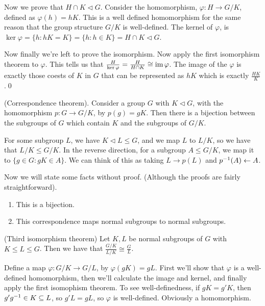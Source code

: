 \documentclass{article}
\newcommand{\nrm}{\triangleleft}
\begin{document}
\par
Now we prove that $ H\cap K\nrm G $. Consider the homomorphism, $ \varphi: H\to G/K $, defined as $ \varphi(h)=hK $. This is a well defined homomorphism for the same reason that the group structure $ G/K $ is well-defined. The kernel of $ \varphi $, is $ \ker \varphi = \{h: hK=K\}=\{h:h\in K\}=H\cap K\nrm G $.

\par
Now finally we're left to prove the isomorphism. Now apply the first isomorphism theorem to $ \varphi $. This tells us that $ \frac H{\ker \varphi}=\frac H {H\cap K}\cong \operatorname{im} \varphi $. The image of the $ \varphi $ is exactly those coests of $ K $ in $ G $ that can be represented as $ hK $ which is exactly $ \frac{HK}K $.\qed
\begin{theorem}
	(Correspondence theorem). Consider a group $ G $ with $ K\nrm G $, with the homomorphism $ p:G\to G/K $, by $ p(g)=gK $. Then there is a bijection between the subgroups of $ G $ which contain $ K $ and the subgroups of $ G/K $.
\end{theorem}
\pf For some subgroup $ L $, we have $ K\nrm L \le G $, and we map $ L $ to $ L/K $, so we have that $ L/K\le G/K $. In the reverse direction, for a subgroup $ A\le G/K $, we map it to $ \{g\in G: gK\in A\} $.
We can think of this as taking $ L\to p(L) $ and $ {p}^{-1}(A)\leftarrow A $.
\par Now we will state some facts without proof. (Although the proofs are fairly straightforward).
\begin{enumerate}
	\item This is a bijection.
	\item This correspondence maps normal subgroups to normal subgroups.
\end{enumerate}
\begin{theorem}
	(Third isomorphism theorem) Let $ K,L $ be normal subgroups of $ G $ with $ K\le L\le G $. Then we have that $ \frac{G/K}{L/K}\cong \frac GL $.
\end{theorem}
\pf Define a map $ \varphi: G/K \rightarrow G/L $, by $ \varphi(gK)=gL $. First we'll show that $ \varphi $ is a well-defined homomorphism, then we'll calculate the image and kernel, and finally apply the first isomophism theorem. To see well-definedness, if $ gK=g'K $, then $ g'{g}^{-1}\in K\subseteq L $, so $ g'L=gL $, so $ \varphi $ is well-defined. Obviously a homomorphism.
\end{document}
